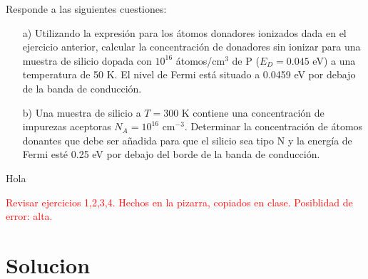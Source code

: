\begin{texercise}
	Responde a las siguientes cuestiones:

	\begin{enumerate}
		\item[a)] Utilizando la expresión para los átomos donadores ionizados dada en el ejercicio anterior, calcular la concentración de donadores sin ionizar para una muestra de silicio dopada con $10^{16}$ átomos/cm$^3$ de P ($E_D = 0.045$ eV) a una temperatura de 50 K. El nivel de Fermi está situado a 0.0459 eV por debajo de la banda de conducción.

		\item[b)] Una muestra de silicio a $T = 300$ K contiene una concentración de impurezas aceptoras $N_A = 10^{16}$ cm$^{-3}$. Determinar la concentración de átomos donantes que debe ser añadida para que el silicio sea tipo N y la energía de Fermi esté 0.25 eV por debajo del borde de la banda de conducción.
	\end{enumerate}

	\tcblower
	Hola
\end{texercise}
\tcbstoprecording







\begin{Anotacion}
	\textcolor{red}{Revisar ejercicios 1,2,3,4. Hechos en la pizarra, copiados en clase. Posiblidad de error: alta.}
\end{Anotacion}

\section{Solucion}
\tcbinputrecords







